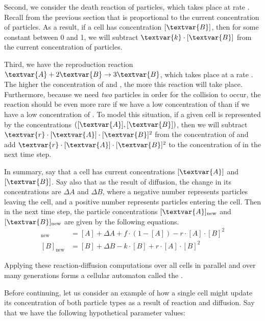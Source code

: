 Second, we consider the death reaction of  particles, which takes place at rate . Recall from the previous section that  is proportional to the current concentration of  particles. As a result, if a cell has concentration $[\textvar{B}]$, then for some constant  between 0 and 1, we will subtract $\textvar{k} \cdot [\textvar{B}]$ from the current concentration of  particles.

Third, we have the reproduction reaction $\textvar{A} + 2\textvar{B} \rightarrow 3\textvar{B}$, which takes place at a rate . The higher the concentration of  and , the more this reaction will take place. Furthermore, because we need \textit{two}  particles in order for the collision to occur, the reaction should be even more rare if we have a low concentration of  than if we have a low concentration of . To model this situation, if a given cell is represented by the concentrations $([\textvar{A}], [\textvar{B}])$, then we will subtract $\textvar{r} \cdot [\textvar{A}] \cdot [\textvar{B}]^2$ from the concentration of  and add $\textvar{r} \cdot [\textvar{A}] \cdot [\textvar{B}]^2$ to the concentration of  in the next time step.

In summary, say that a cell has current concentrations $[\textvar{A}]$ and $[\textvar{B}]$. Say also that as the result of diffusion, the change in its concentrations are $\Delta A$ and $\Delta B$, where a negative number represents particles leaving the cell, and a positive number represents particles entering the cell. Then in the next time step, the particle concentrations $[\textvar{A}]_{\text{new}}$ and $[\textvar{B}]_{\text{new}}$ are given by the following equations.
\begin{align*}
[A]_{\text{new}} & = [A] + \Delta A + f \cdot (1-[A]) - r \cdot [A] \cdot [B]^2\\
[B]_{\text{new}} & = [B] + \Delta B - k \cdot [B] + r \cdot [A] \cdot [B]^2
\end{align*}

Applying these reaction-diffusion computations over all cells in parallel and over many generations forms a cellular automaton called the .

Before continuing, let us consider an example of how a single cell might update its concentration of both particle types as a result of reaction and diffusion.  Say that we have the following hypothetical parameter values:

